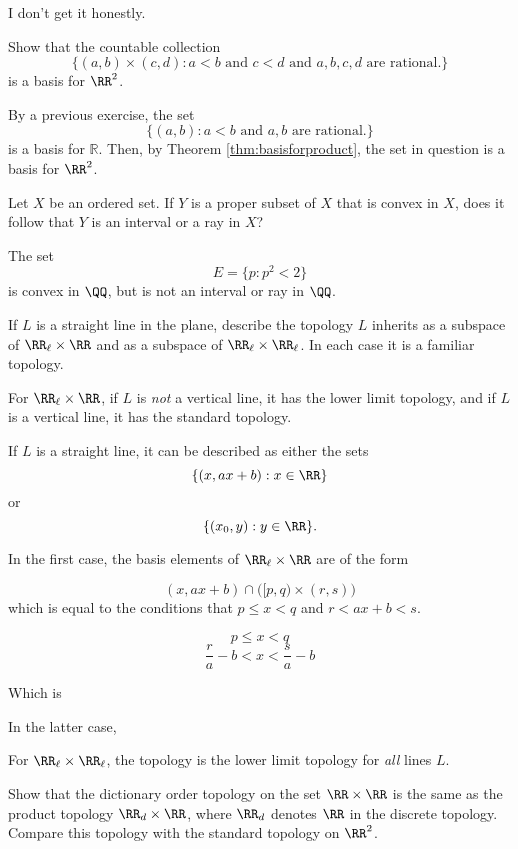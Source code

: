 \documentclass{article}
\begin{document}
I don't get it honestly.

\begin{exercise}
    Show that the countable collection
    \[
        \{(a,b)\times(c,d) : a<b \text{ and } c<d \text{ and } a,b,c,d \text{ are rational.}\}
    \]
    is a basis for $\RR^2$.
\end{exercise}

By a previous exercise, the set
\[
    \{(a,b): a<b \text{ and }a,b \text{ are rational.}\}
\]
is a basis for $\mathbb{R}$.
Then, by Theorem \ref{thm:basisforproduct}, the set in question is a basis for $\RR^2$.

\begin{exercise}
    Let $X$ be an ordered set.
    If $Y$ is a proper subset of $X$ that is convex in $X$, does it follow that $Y$ is an interval or a ray in $X$?
\end{exercise}

The set
\[
    E = \{p : p^2 < 2\}
\]
is convex in $\QQ$, but is not an interval or ray in $\QQ$.

\begin{exercise}
    If $L$ is a straight line in the plane, describe the topology $L$ inherits as a subspace of $\RR_\ell \times \RR$ and as a subspace of $\RR_\ell \times \RR_\ell$.
    In each case it is a familiar topology.
\end{exercise}

For $\RR_\ell \times \RR$, if $L$ is \textit{not} a vertical line, it has the lower limit topology, and if $L$ is a vertical line, it has the standard topology.



If $L$ is a straight line, it can be described as either the sets
\[
    \{ (x, ax+b) : x \in \RR \}
\]
or
\[
    \{(x_0, y) : y \in \RR \}.
\]

In the first case, the basis elements of $\RR_\ell \times \RR$ are of the form

\[
    (x, ax+b) \cap \Big([p,q) \times (r,s)\Big)
\]
which is equal to the conditions that $p \leq x < q$ and $r < ax+b < s$.

\[
    p \leq x < q
\]
\[
    \frac{r}{a} - b < x < \frac{s}{a} - b
\]

Which is

In the latter case, 


For $\RR_\ell \times \RR_\ell$, the topology is the lower limit topology for \textit{all} lines $L$.

\begin{exercise}
    Show that the dictionary order topology on the set $\RR \times \RR$ is the same as the product topology $\RR_d \times \RR$, where $\RR_d$ denotes $\RR$ in the discrete topology.
    Compare this topology with the standard topology on $\RR^2$.
\end{exercise}
\end{document}
